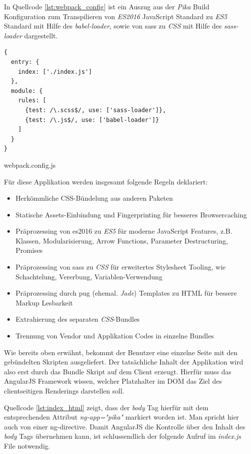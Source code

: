 In Quellcode \ref{lst:webpack_config} ist ein Auszug aus der \emph{Pika} Build Konfiguration zum Transpilieren von \emph{ES2016} JavaScript Standard zu \emph{ES5} Standard mit Hilfe des \emph{babel-loader}, sowie von \gls{sass} zu \emph{CSS} mit Hilfe des \emph{sass-loader} dargestellt.

\begin{listing}[H]
\begin{verbatim}
{
  entry: {
    index: ['./index.js']
  },
  module: {
    rules: [
      {test: /\.scss$/, use: ['sass-loader']},
      {test: /\.js$/, use: ['babel-loader']}
    ]
  }
}
\end{verbatim}
\caption{webpack.config.js}
\label{lst:webpack_config}
\end{listing}

Für diese Applikation werden insgesamt folgende Regeln deklariert:

\begin{itemize}
 \item Herkömmliche CSS-Bündelung aus anderen Paketen
 \item Statische Assets-Einbindung und Fingerprinting für besseres Browsercaching
 \item Präprozessing von \gls{es2016} zu \emph{ES5} für moderne JavaScript Features, z.B. Klassen, Modularisierung, Arrow Functions, Parameter Destructuring, Promises
 \item Präprozessing von \gls{sass} zu \emph{CSS} für erweitertes Stylesheet Tooling, wie Schachtelung, Vererbung, Variablen-Verwendung
 \item Präprozessing durch \gls{pug} (ehemal. \emph{Jade}) Templates zu HTML für bessere Markup Lesbarkeit
 \item Extrahierung des separaten \emph{CSS}-Bundles
 \item Trennung von Vendor und Applikation Codes in einzelne Bundles
\end{itemize}

Wie bereits oben erwähnt, bekommt der Benutzer eine einzelne Seite mit den gebündelten Skripten ausgeliefert. Der tatsächliche Inhalt der Applikation wird also erst durch das Bundle Skript auf dem Client erzeugt. Hierfür muss das AngularJS Framework wissen, welcher Platzhalter im DOM das Ziel des clientseitigen Renderings darstellen soll.

Quellcode \ref{lst:index_html} zeigt, dass der \emph{body} Tag hierfür mit dem entsprechenden Attribut \emph{ng-app="pika"} markiert worden ist. Man spricht hier auch von einer \gls{ng-directive}. Damit AngularJS die Kontrolle über den Inhalt des \emph{body} Tags übernehmen kann, ist schlussendlich der folgende Aufruf im \emph{index.js} File notwendig.


